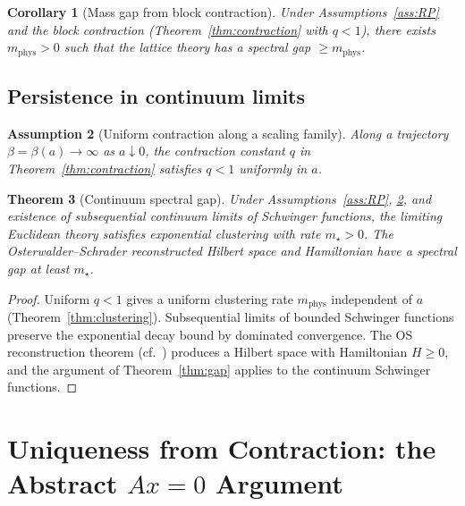 \documentclass[11pt]{article}
\newtheorem{theorem}{Theorem}[section]
\newtheorem{corollary}[theorem]{Corollary}
\newtheorem{assumption}[theorem]{Assumption}
\theoremstyle{definition}
\newcommand{\1}{\mathbf{1}}
\begin{document}
\begin{corollary}[Mass gap from block contraction]\label{cor:gap}
Under Assumptions~\ref{ass:RP} and the block contraction (Theorem~\ref{thm:contraction}
with $q<1$), there exists $m_{\mathrm{phys}}>0$ such that the lattice theory has a spectral
gap $\ge m_{\mathrm{phys}}$.
\end{corollary}

\subsection{Persistence in continuum limits}

\begin{assumption}[Uniform contraction along a scaling family]\label{ass:uniform}
Along a trajectory $\beta=\beta(a)\to\infty$ as $a\downarrow 0$, the contraction constant
$q$ in Theorem~\ref{thm:contraction} satisfies $q<1$ uniformly in $a$.
\end{assumption}

\begin{theorem}[Continuum spectral gap]\label{thm:continuum-gap}
Under Assumptions~\ref{ass:RP}, \ref{ass:uniform}, and existence of subsequential continuum
limits of Schwinger functions, the limiting Euclidean theory satisfies exponential clustering
with rate $m_\star>0$.  The Osterwalder--Schrader reconstructed Hilbert space and Hamiltonian
have a spectral gap at least $m_\star$.
\end{theorem}

\begin{proof}
Uniform $q<1$ gives a uniform clustering rate $m_{\mathrm{phys}}$ independent of $a$
(Theorem~\ref{thm:clustering}).  Subsequential limits of bounded Schwinger functions preserve
the exponential decay bound by dominated convergence.  The OS reconstruction theorem
(cf.~\cite{OsterwalderSchrader1,OsterwalderSchrader2,GlimmJaffe}) produces a Hilbert space
with Hamiltonian $H\ge 0$, and the argument of Theorem~\ref{thm:gap} applies to the
continuum Schwinger functions.
\end{proof}

\section{Uniqueness from Contraction: the Abstract $Ax=0$ Argument}\label{sec:uniqueness}
\end{document}
